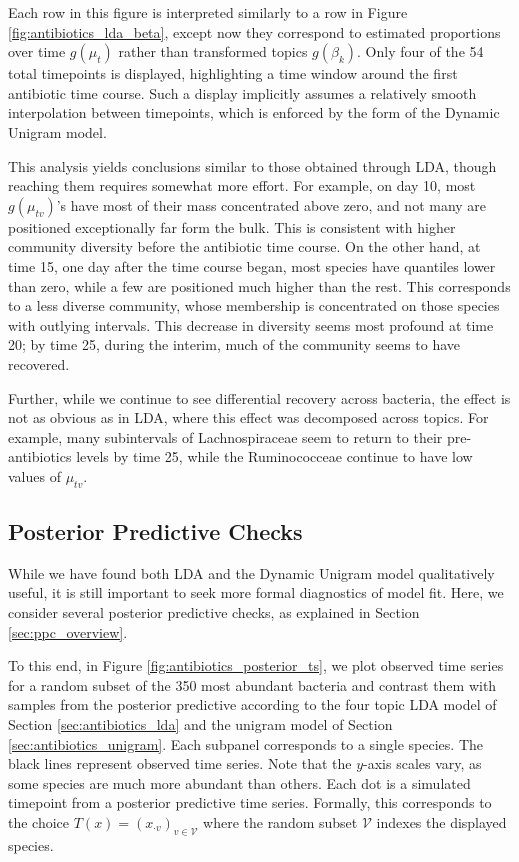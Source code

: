 \documentclass[oupdraft]{bio}
\begin{document}
Each row in this figure is interpreted similarly to a row in Figure
\ref{fig:antibiotics_lda_beta}, except now they correspond to estimated
proportions over time $g\left(\mu_{t}\right)$ rather than transformed topics
$g\left(\beta_{k}\right)$. Only four of the 54 total timepoints
is displayed, highlighting a time window around the first antibiotic time
course. Such a display implicitly assumes a relatively smooth interpolation
between timepoints, which is enforced by the form of the Dynamic Unigram model.

This analysis yields conclusions similar to those obtained through LDA, though
reaching them requires somewhat more effort. For example, on day 10, most
$g\left(\mu_{tv}\right)$'s have most of their mass concentrated above zero, and
not many are positioned exceptionally far form the bulk. This is consistent with
higher community diversity before the antibiotic time course. On the other hand,
at time 15, one day after the time course began, most species have quantiles
lower than zero, while a few are positioned much higher than the rest. This
corresponds to a less diverse community, whose membership is concentrated on
those species with outlying intervals. This decrease in diversity seems most
profound at time 20; by time 25, during the interim, much of the community seems
to have recovered.

Further, while we continue to see differential recovery across bacteria, the
effect is not as obvious as in LDA, where this effect was decomposed across
topics. For example, many subintervals of Lachnospiraceae seem to return to
their pre-antibiotics levels by time 25, while the Ruminococceae continue to
have low values of $\mu_{tv}$.

\subsection{Posterior Predictive Checks}
\label{sec:antibiotics_ppc}

While we have found both LDA and the Dynamic Unigram model qualitatively useful,
it is still important to seek more formal diagnostics of model fit. Here, we
consider several posterior predictive checks, as explained in Section
\ref{sec:ppc_overview}.

To this end, in Figure \ref{fig:antibiotics_posterior_ts}, we plot observed time
series for a random subset of the 350 most abundant bacteria and contrast them
with samples from the posterior predictive according to the four topic LDA model
of Section \ref{sec:antibiotics_lda} and the unigram model of Section
\ref{sec:antibiotics_unigram}. Each subpanel corresponds to a single species. The
black lines represent observed time series. Note that the $y$-axis scales vary,
as some species are much more abundant than others. Each dot is a simulated
timepoint from a posterior predictive time series. Formally, this corresponds to
the choice $T\left(x\right) = \left(x_{\cdot v}\right)_{v \in \mathcal{V}}$
where the random subset $\mathcal{V}$ indexes the displayed species.
\end{document}
